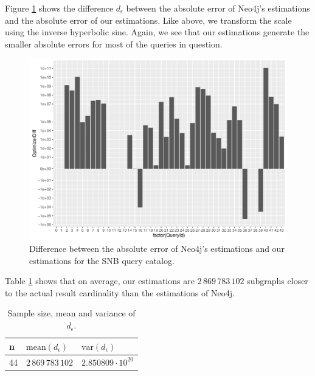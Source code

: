 Figure \ref{fig:abs-error-diff-snb} shows the difference $d_\epsilon$
between the absolute
error of Neo4j's estimations and the absolute error of our estimations.
Like above, we transform the scale using the inverse hyperbolic sine.
Again, we see that our estimations generate the smaller absolute
errors for most of the queries in question.

\begin{figure}
  \centering
  \includegraphics[width=\textwidth]{figures/eval/abs_error_diff_snb.pdf}
  \caption{Difference between the absolute error of Neo4j's estimations
           and our estimations for the SNB query catalog.}
  \label{fig:abs-error-diff-snb}
\end{figure}

Table \ref{table:abs-error-diff-stats} shows that
on average, our estimations are $2\,869\,783\,102$ subgraphs closer to the
actual result cardinality than the estimations of Neo4j.

\begin{table}[h]
\centering
\begin{tabular}{@{}lll@{}}
\toprule
n  & $\text{mean}(d_\epsilon)$    & $\text{var}(d_\epsilon)$ \\ \midrule
44 & $2\,869\,783\,102$           & $2.850809 \cdot 10^{20}$ \\ \bottomrule
\end{tabular}
\caption{Sample size, mean and variance of $d_\epsilon$.}
\label{table:abs-error-diff-stats}
\end{table}

